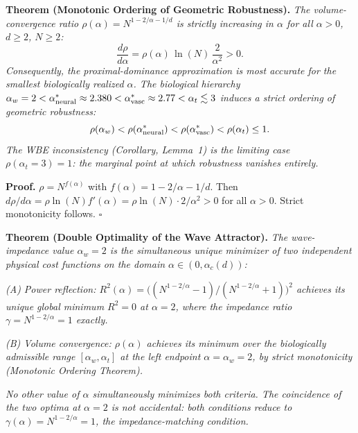\documentclass[11pt,a4paper]{article}
\theoremstyle{remark}
\begin{document}
\vspace{0.5em}
\noindent\textbf{Theorem (Monotonic Ordering of Geometric Robustness).}
\textit{The volume-convergence ratio $\rho(\alpha) = N^{1-2/\alpha-1/d}$ is strictly increasing in $\alpha$ for all $\alpha > 0$, $d \geq 2$, $N \geq 2$:}
\begin{equation}
\frac{d\rho}{d\alpha} = \rho(\alpha)\,\ln(N)\,\frac{2}{\alpha^2} > 0.
\end{equation}
\textit{Consequently, the proximal-dominance approximation is most accurate for the smallest biologically realized $\alpha$. The biological hierarchy $\alpha_w = 2 < \alpha^*_{\rm neural} \approx 2.380{} < \alpha^*_{\rm vasc} \approx 2.77{} < \alpha_t \lesssim 3$ induces a strict ordering of geometric robustness:}
\begin{equation}
\rho(\alpha_w) < \rho(\alpha^*_{\rm neural}) < \rho(\alpha^*_{\rm vasc}) < \rho(\alpha_t) \leq 1.
\end{equation}
\textit{The WBE inconsistency (Corollary, Lemma~1) is the limiting case $\rho(\alpha_t = 3) = 1$: the marginal point at which robustness vanishes entirely.}

\noindent\textbf{Proof.} $\rho = N^{f(\alpha)}$ with $f(\alpha) = 1-2/\alpha-1/d$. Then $d\rho/d\alpha = \rho \ln(N) f'(\alpha) = \rho \ln(N) \cdot 2/\alpha^2 > 0$ for all $\alpha > 0$. Strict monotonicity follows. $\square$

\vspace{0.5em}
\noindent\textbf{Theorem (Double Optimality of the Wave Attractor).}
\textit{The wave-impedance value $\alpha_w = 2$ is the simultaneous unique minimizer of two independent physical cost functions on the domain $\alpha \in (0, \alpha_c(d))$:}

\textit{(A) Power reflection: $R^2(\alpha) = \bigl((N^{1-2/\alpha}-1)/(N^{1-2/\alpha}+1)\bigr)^2$ achieves its unique global minimum $R^2 = 0$ at $\alpha = 2$, where the impedance ratio $\gamma = N^{1-2/\alpha} = 1$ exactly.}

\textit{(B) Volume convergence: $\rho(\alpha)$ achieves its minimum over the biologically admissible range $[\alpha_w, \alpha_t]$ at the left endpoint $\alpha = \alpha_w = 2$, by strict monotonicity (Monotonic Ordering Theorem).}

\textit{No other value of $\alpha$ simultaneously minimizes both criteria. The coincidence of the two optima at $\alpha = 2$ is not accidental: both conditions reduce to $\gamma(\alpha) = N^{1-2/\alpha} = 1$, the impedance-matching condition.}
\end{document}
